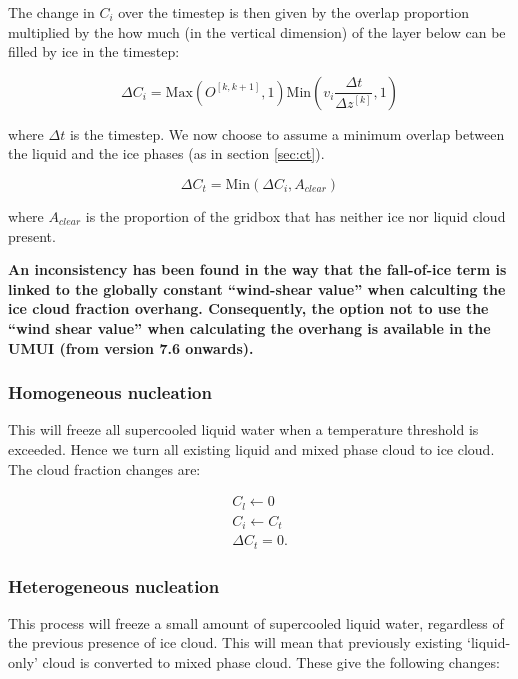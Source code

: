 \documentclass{UMDP_article}
\begin{document}
The change in $C_i$ over the timestep is then given by the overlap proportion
multiplied by the how much (in the vertical dimension) of the layer below
can be filled by ice in the timestep:

\begin{equation}
\Delta C_i = \text{Max}(O^{[k,k+1]} , 1)  \text{Min} (v_i \frac{\Delta t}{\Delta z^{[k]}} , 1)
\label{eq:lsp_fall}
\end{equation}

where $\Delta t$ is the timestep. We now choose to assume a minimum overlap
between the liquid and the ice phases (as in section \ref{sec:ct}).

\begin{equation}
\Delta C_t = \text{Min} ( \Delta C_i , A_{clear} )
\label{eq:lsp_fall_ct}
\end{equation}

where $A_{clear}$ is the proportion of the gridbox that has neither
ice nor liquid cloud present.

\textbf{An inconsistency has been found in the way that the fall-of-ice term is linked to the globally constant ``wind-shear value'' 
when calculting the ice cloud fraction overhang. Consequently,  
the option not to use the ``wind shear value'' when calculating the overhang is available in 
the UMUI (from version 7.6 onwards).}

\subsubsection{Homogeneous nucleation}
\label{sec:lsp_homo}
This will freeze all supercooled liquid water when a temperature threshold
is exceeded. Hence we turn all existing liquid and mixed phase cloud to
ice cloud. The cloud fraction changes are:

\begin{eqnarray}
C_l \leftarrow 0  \nonumber \\ 
C_i \leftarrow C_t \nonumber \\
\Delta C_t = 0.
\label{eq:lsp_homo}
\end{eqnarray}

\subsubsection{Heterogeneous nucleation}
This process will freeze a small amount of supercooled liquid water,
regardless of the previous presence of ice cloud. This will mean that
previously existing `liquid-only' cloud is converted to mixed phase
cloud. These give the following changes:
\end{document}
